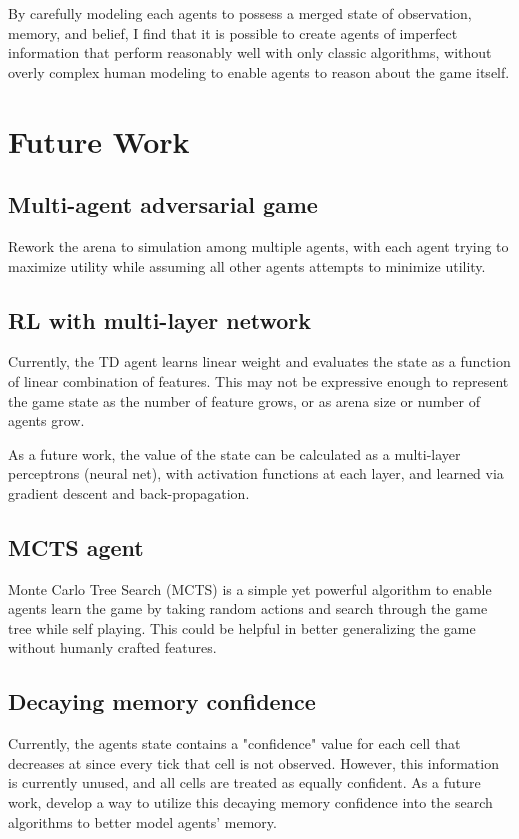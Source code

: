 \documentclass{article}
\begin{document}
By carefully modeling each agents to possess a merged state of observation, memory, and belief, I find that it is possible to create agents of imperfect information that perform reasonably well with only classic algorithms, without overly complex human modeling to enable agents to reason about the game itself.

\section{Future Work}

\subsection{Multi-agent adversarial game}

Rework the arena to simulation among multiple agents, with each agent trying to maximize utility while assuming all other agents attempts to minimize utility.

\subsection{RL with multi-layer network}

Currently, the TD agent learns linear weight and evaluates the state as a function of linear combination of features. This may not be expressive enough to represent the game state as the number of feature grows, or as arena size or number of agents grow.

As a future work, the value of the state can be calculated as a multi-layer perceptrons (neural net), with activation functions at each layer, and learned via gradient descent and back-propagation.

\subsection{MCTS agent}

Monte Carlo Tree Search (MCTS) is a simple yet powerful algorithm to enable agents learn the game by taking random actions and search through the game tree while self playing. This could be helpful in better generalizing the game without humanly crafted features.

\subsection{Decaying memory confidence}

Currently, the agents state contains a "confidence" value for each cell that decreases at since every tick that cell is not observed. However, this information is currently unused, and all cells are treated as equally confident. As a future work, develop a way to utilize this decaying memory confidence into the search algorithms to better model agents' memory.
\end{document}
